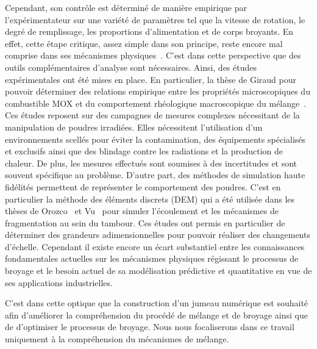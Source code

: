 Cependant, son contrôle est déterminé de manière empirique par l'expérimentateur sur une variété de paramètres tel que la vitesse de rotation, le degré de remplissage, les proportions d'alimentation et de corps broyants. En effet, cette étape critique, assez simple dans son principe, reste encore mal comprise dans ses mécanismes physiques~\cite{Austin1981,Brandao2020,Mankosa1986,Datta2002,Capece2014}. C'est dans cette perspective que des outils complémentaires d'analyse sont nécessaires. Ainsi, des études expérimentales ont été mises en place. En particulier, la thèse de Giraud pour pouvoir déterminer des relations empirique entre les propriétés microscopiques du combustible MOX et du comportement rhéologique macroscopique du mélange~\cite{giraud_analyse_2020}. Ces études reposent sur des campagnes de mesures complexes nécessitant de la manipulation de poudres irradiées. Elles nécessitent l'utilisation d'un environnements scellés pour éviter la contamination, des équipements spécialisés et exclusifs ainsi que des blindage contre les radiations et la production de chaleur. De plus, les mesures effectués sont soumises à des incertitudes et sont souvent spécifique au problème.
D'autre part, des méthodes de simulation haute fidélités permettent de représenter le comportement des poudres. C'est en particulier la méthode des éléments discrets (DEM) qui a été utilisée dans les thèses de Orozco~\cite{Orozco2019} et Vu~\cite{vu_quasi-static_2023} pour simuler l'écoulement et les mécanismes de fragmentation au sein du tambour. Ces études ont permis en particulier de déterminer des grandeurs adimensionnelles pour pouvoir réaliser des changements d'échelle. Cependant il existe encore un écart substantiel entre les connaissances fondamentales actuelles sur les mécanismes physiques régissant le processus de broyage et le besoin actuel de sa modélisation prédictive et quantitative en vue de ses applications industrielles.

C'est dans cette optique que la construction d'un jumeau numérique est souhaité afin d'améliorer la compréhension du procédé de mélange et de broyage ainsi que de d'optimiser le processus de broyage. Nous nous focaliserons dans ce travail uniquement à la compréhension du mécanismes de mélange.



